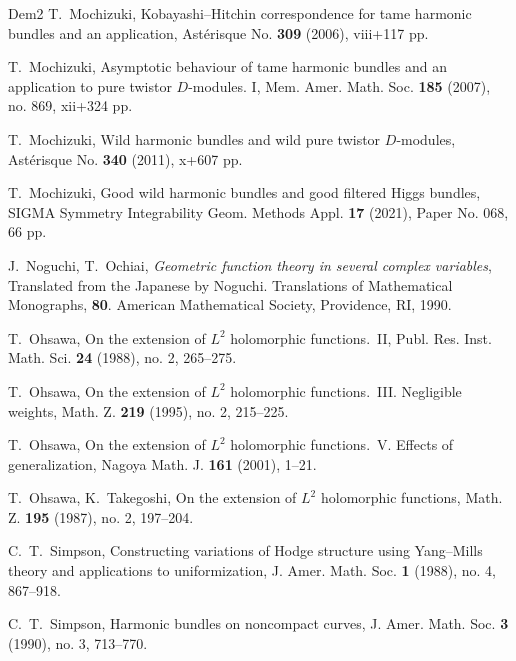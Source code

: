 \documentclass[12pt,twoside]{amsart}
\theoremstyle{definition}
\begin{document}
\begin{thebibliography}{Dem2}
T.~Mochizuki, 
Kobayashi--Hitchin correspondence 
for tame harmonic bundles and an application, 
Ast\'erisque No. \textbf{309} (2006), viii+117 pp. 

T.~Mochizuki, 
Asymptotic behaviour of tame harmonic 
bundles and an application to pure 
twistor $D$-modules. I, Mem. Amer. Math. Soc. \textbf{185} 
(2007), no. 869, xii+324 pp. 

T.~Mochizuki, 
Wild harmonic bundles and wild pure 
twistor $D$-modules, Ast\'erisque No. \textbf{340} (2011), 
x+607 pp. 

T.~Mochizuki, 
Good wild harmonic bundles and good filtered Higgs bundles, 
SIGMA Symmetry 
Integrability Geom. Methods 
Appl. \textbf{17} (2021), Paper No. 068, 66 pp. 

J.~Noguchi, T.~Ochiai, {\em{Geometric function theory in several complex 
variables}}, Translated from the Japanese by 
Noguchi. Translations of Mathematical 
Monographs, \textbf{80}. American 
Mathematical Society, Providence, RI, 1990. 

T.~Ohsawa, On the extension of $L^2$ holomorphic functions.~II, 
Publ. Res. Inst. Math. Sci. \textbf{24} (1988), no. 2, 265--275.

T.~Ohsawa, 
On the extension of $L^2$ holomorphic functions.~III. Negligible 
weights, Math. Z. \textbf{219} (1995), no. 2, 215--225.

T.~Ohsawa, 
On the extension of $L^2$ holomorphic functions.~V. Effects of generalization, Nagoya Math. J. \textbf{161} (2001), 1--21.

T.~Ohsawa, K.~Takegoshi, 
On the extension of $L^2$ holomorphic functions, 
Math. Z. \textbf{195} (1987), no. 2, 197--204.

C.~T.~Simpson, 
Constructing variations of Hodge 
structure using Yang--Mills theory 
and applications to uniformization, 
J. Amer. Math. Soc. \textbf{1} (1988), no. 4, 867--918. 

C.~T.~Simpson, 
Harmonic bundles on noncompact 
curves, J. Amer. Math. Soc. \textbf{3} (1990), no. 3, 713--770.

\end{thebibliography}
\end{document}

